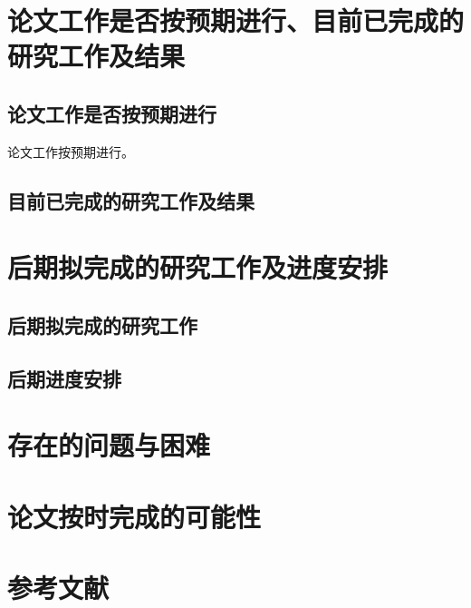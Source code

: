 \section{论文工作是否按预期进行、目前已完成的研究工作及结果}
\subsection{论文工作是否按预期进行}

论文工作按预期进行。

\subsection{目前已完成的研究工作及结果}


\section{后期拟完成的研究工作及进度安排}
\subsection{后期拟完成的研究工作}

\subsection{后期进度安排}

\section{存在的问题与困难}

\section{论文按时完成的可能性}
\cite{cnproceed}

\section{参考文献}




